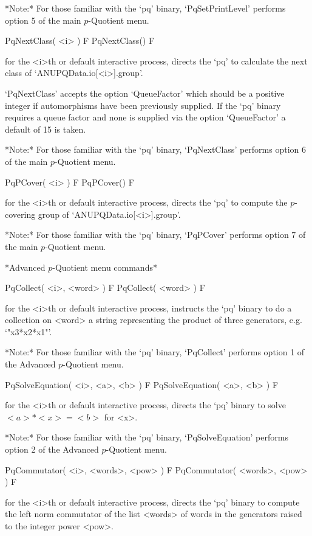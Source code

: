 *Note:* For  those  familiar  with  the  `pq'  binary,  `PqSetPrintLevel'
performs option 5 of the main $p$-Quotient menu.

\>PqNextClass( <i> ) F
\>PqNextClass() F

for the <i>th or default interactive {\ANUPQ} process, directs  the  `pq'
to calculate the next class of `ANUPQData.io[<i>].group'. 

`PqNextClass'  accepts  the  option  `QueueFactor'  which  should  be   a
positive integer if automorphisms have been previously supplied.  If  the
`pq' binary requires a queue factor and none is supplied via  the  option
`QueueFactor' a default of 15 is taken.

*Note:* For those familiar with the `pq' binary,  `PqNextClass'  performs
option 6 of the main $p$-Quotient menu.

\>PqPCover( <i> ) F
\>PqPCover() F

for the <i>th or default interactive {\ANUPQ} process, directs  the  `pq'
to compute the $p$-covering group of `ANUPQData.io[<i>].group'.

*Note:* For those familiar with  the  `pq'  binary,  `PqPCover'  performs
option 7 of the main $p$-Quotient menu.

*Advanced $p$-Quotient menu commands*

\>PqCollect( <i>, <word> ) F
\>PqCollect( <word> ) F

for the <i>th or default interactive {\ANUPQ} process, instructs the `pq'
binary to do a collection on <word> a string representing the product  of
three generators, e.g. `"x3*x2*x1"'.

*Note:* For those familiar with the  `pq'  binary,  `PqCollect'  performs
option 1 of the Advanced $p$-Quotient menu.

\>PqSolveEquation( <i>, <a>, <b> ) F
\>PqSolveEquation( <a>, <b> ) F

for the <i>th or default interactive {\ANUPQ} process, directs  the  `pq'
binary to solve $<a> * <x> = <b>$ for <x>. 

*Note:* 
For those familiar  with  the  `pq'  binary,  `PqSolveEquation'  performs
option 2 of the Advanced $p$-Quotient menu.

\>PqCommutator( <i>, <words>, <pow> ) F
\>PqCommutator( <words>, <pow> ) F

for the <i>th or default interactive {\ANUPQ} process, directs  the  `pq'
binary to compute the left norm commutator of the list <words>  of  words
in the generators raised to the integer power <pow>.

